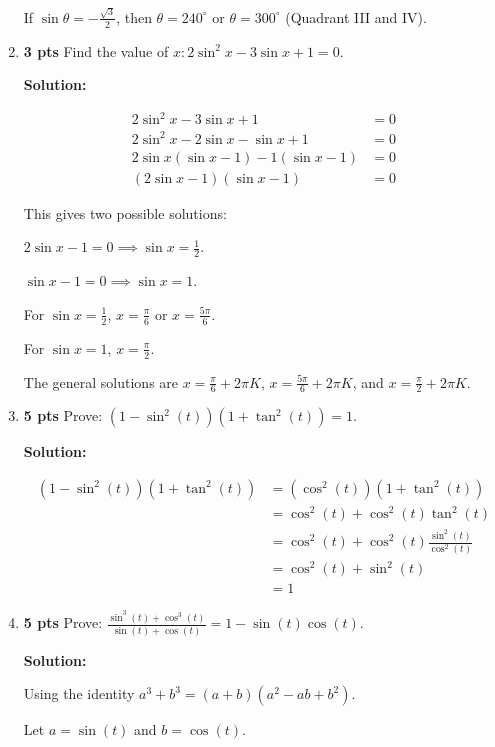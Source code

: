 \documentclass[nohyper,nobib,xcolor=dvipsnames,svgnames,x11names]{tufte-book}
\newenvironment{multiequation}{%
  \setlength{\abovedisplayskip}{3pt}      %
  \setlength{\belowdisplayskip}{6pt}      %
  \setlength{\abovedisplayshortskip}{3pt} %
  \setlength{\belowdisplayshortskip}{6pt} %
  \begin{equation}%
    \begin{aligned}%
}{%
    \end{aligned}%
  \end{equation}%
}
\begin{document}
\begin{enumerate}
    If $\sin\theta = -\frac{\sqrt{3}}{2}$, then $\theta = 240^\circ$ or $\theta = 300^\circ$ (Quadrant III and IV).


    \item \textbf{3 pts} Find the value of $x: 2\sin^2x-3\sin x+1=0$.
    
     \textbf{Solution:}
     
    \begin{multiequation}
        2\sin^2x-3\sin x+1 &= 0 \\
        2\sin^2x-2\sin x-\sin x+1 &= 0 \\
        2\sin x(\sin x-1)-1(\sin x-1) &= 0 \\
        (2\sin x-1)(\sin x-1) &= 0
    \end{multiequation}
    
    This gives two possible solutions:
    
    $2\sin x - 1 = 0 \implies \sin x = \frac{1}{2}$.
    
    $\sin x - 1 = 0 \implies \sin x = 1$.

    For $\sin x = \frac{1}{2}$, $x = \frac{\pi}{6}$ or $x = \frac{5\pi}{6}$.
    
    For $\sin x = 1$, $x = \frac{\pi}{2}$.
    
    The general solutions are $x = \frac{\pi}{6}+2\pi K$, $x = \frac{5\pi}{6}+2\pi K$, and $x = \frac{\pi}{2}+2\pi K$.

    \item \textbf{5 pts} Prove: $(1-\sin^2(t))(1+\tan^2(t))=1$.
    
    \textbf{Solution:}
    
    \begin{multiequation}
        (1-\sin^2(t))(1+\tan^2(t)) &= (\cos^2(t))(1+\tan^2(t)) \\
        &= \cos^2(t) + \cos^2(t)\tan^2(t) \\
        &= \cos^2(t) + \cos^2(t)\frac{\sin^2(t)}{\cos^2(t)} \\
        &= \cos^2(t) + \sin^2(t) \\
        &= 1
    \end{multiequation}

    \item \textbf{5 pts} Prove: $\frac{\sin^3(t)+\cos^3(t)}{\sin(t)+\cos(t)}=1-\sin(t)\cos(t)$.
    
    \textbf{Solution:}
    
    Using the identity $a^3+b^3=(a+b)(a^2-ab+b^2)$.
    
    Let $a=\sin(t)$ and $b=\cos(t)$.


\end{enumerate}
\end{document}
